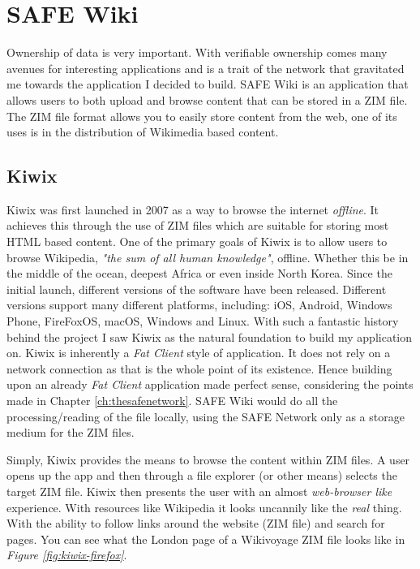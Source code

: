 \chapter{SAFE Wiki}

Ownership of data is very important. With verifiable ownership comes many avenues for interesting applications and is a trait of the network that gravitated me towards the application I decided to build. SAFE Wiki is an application that allows users to both upload and browse content that can be stored in a ZIM file. The ZIM file format allows you to easily store content from the web, one of its uses is in the distribution of Wikimedia based content.

\section{Kiwix}

Kiwix was first launched in 2007 as a way to browse the internet \textit{offline}. It achieves this through the use of ZIM files which are suitable for storing most HTML based content. One of the primary goals of Kiwix is to allow users to browse Wikipedia, \textit{"the sum of all human knowledge"}, offline. Whether this be in the middle of the ocean, deepest Africa or even inside North Korea. Since the initial launch, different versions of the software have been released. Different versions support many different platforms, including: iOS, Android, Windows Phone, FireFoxOS, macOS, Windows and Linux. With such a fantastic history behind the project I saw Kiwix as the natural foundation to build my application on. Kiwix is inherently a \textit{Fat Client} style of application. It does not rely on a network connection as that is the whole point of its existence. Hence building upon an already \textit{Fat Client} application made perfect sense, considering the points made in Chapter \ref{ch:thesafenetwork}. SAFE Wiki would do all the processing/reading of the file locally, using the SAFE Network only as a storage medium for the ZIM files.

Simply, Kiwix provides the means to browse the content within ZIM files. A user opens up the app and then through a file explorer (or other means) selects the target ZIM file. Kiwix then presents the user with an almost \textit{web-browser like} experience. With resources like Wikipedia it looks uncannily like the \textit{real} thing. With the ability to follow links around the website (ZIM file) and search for pages. You can see what the London page of a Wikivoyage ZIM file looks like in \textit{Figure \ref{fig:kiwix-firefox}}.

